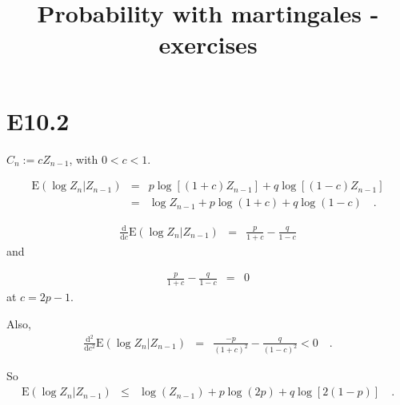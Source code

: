\documentclass[11pt]{article} %
\title{Probability with martingales - exercises}
\author{}
\date{} %
\begin{document}
{\bf \maketitle \par}


\section*{E10.2}


\vspace{\baselineskip}

$C_{n}:=cZ_{n-1}$, with $0<c<1$.

\vspace{\baselineskip}
\begin{equation*}
\begin{array}{lcl}
\mathrm{E}\left(\log Z_{n}|Z_{n-1}\right)&=&p \log\left[\left(1+c\right)Z_{n-1}\right]+q \log \left[\left(1-c\right)Z_{n-1}\right]\\
&=&\log Z_{n-1} + p \log \left(1+c\right)+q \log \left(1-c \right) \quad.
\end{array}
\end{equation*}

\begin{equation*}
\begin{array}{lll}
\frac{\mathrm{d}}{\mathrm{d}c}\mathrm{E}\left(\log Z_{n}|Z_{n-1}\right)&=&\frac{p}{1+c}-\frac{q}{1-c} 
\end{array}
\end{equation*}
and

\begin{equation*}
\begin{array}{lll}
\frac{p}{1+c}-\frac{q}{1-c} &=&0
\end{array}
\end{equation*}
at $c=2p-1$.

Also,
\begin{equation*}
\begin{array}{lll}
\frac{\mathrm{d}^{2}}{\mathrm{d}c^{2}}\mathrm{E}\left(\log Z_{n}|Z_{n-1}\right)&=&\frac{-p}{\left(1+c\right)^{2}}-\frac{q}{\left(1-c\right)^{2}} < 0 \quad.
\end{array}
\end{equation*}

So 
\begin{equation*}
\begin{array}{lcl}
\mathrm{E}\left(\log Z_{n}|Z_{n-1}\right)&\leq& \log \left(Z_{n-1} \right)+p \log \left(2p \right) + q \log \left[2\left(1-p\right)\right] \quad.
\end{array}
\end{equation*}
\end{document}
